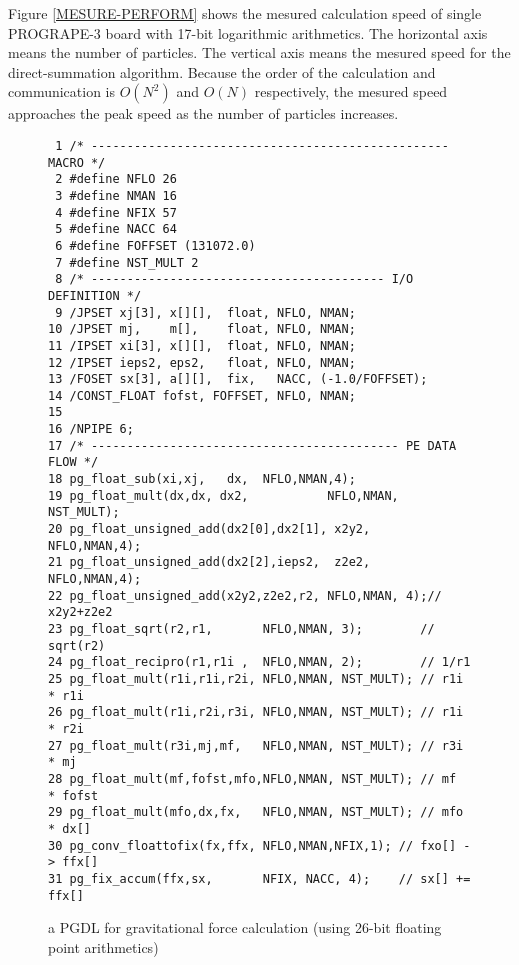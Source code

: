 \documentclass[times, 10pt,twocolumn]{article}
\begin{document}
Figure \ref{MESURE-PERFORM} shows the mesured calculation speed of
single PROGRAPE-3 board with 17-bit logarithmic arithmetics.  The
horizontal axis means the number of particles.  The vertical axis
means the mesured speed for the direct-summation algorithm.  Because
the order of the calculation and communication is $O(N^2)$ and $O(N)$
respectively, the mesured speed approaches the peak speed as the
number of particles increases.

\begin{figure}
\scriptsize
{\tiny
\begin{verbatim}
 1 /* -------------------------------------------------- MACRO */
 2 #define NFLO 26
 3 #define NMAN 16
 4 #define NFIX 57
 5 #define NACC 64
 6 #define FOFFSET (131072.0)
 7 #define NST_MULT 2
 8 /* ----------------------------------------- I/O DEFINITION */
 9 /JPSET xj[3], x[][],  float, NFLO, NMAN;
10 /JPSET mj,    m[],    float, NFLO, NMAN;
11 /IPSET xi[3], x[][],  float, NFLO, NMAN;
12 /IPSET ieps2, eps2,   float, NFLO, NMAN;
13 /FOSET sx[3], a[][],  fix,   NACC, (-1.0/FOFFSET);
14 /CONST_FLOAT fofst, FOFFSET, NFLO, NMAN;
15
16 /NPIPE 6;
17 /* ------------------------------------------- PE DATA FLOW */
18 pg_float_sub(xi,xj,   dx,  NFLO,NMAN,4);
19 pg_float_mult(dx,dx, dx2,           NFLO,NMAN, NST_MULT);
20 pg_float_unsigned_add(dx2[0],dx2[1], x2y2,  NFLO,NMAN,4);
21 pg_float_unsigned_add(dx2[2],ieps2,  z2e2,  NFLO,NMAN,4);
22 pg_float_unsigned_add(x2y2,z2e2,r2, NFLO,NMAN, 4);// x2y2+z2e2
23 pg_float_sqrt(r2,r1,       NFLO,NMAN, 3);        // sqrt(r2)
24 pg_float_recipro(r1,r1i ,  NFLO,NMAN, 2);        // 1/r1
25 pg_float_mult(r1i,r1i,r2i, NFLO,NMAN, NST_MULT); // r1i * r1i
26 pg_float_mult(r1i,r2i,r3i, NFLO,NMAN, NST_MULT); // r1i * r2i
27 pg_float_mult(r3i,mj,mf,   NFLO,NMAN, NST_MULT); // r3i * mj
28 pg_float_mult(mf,fofst,mfo,NFLO,NMAN, NST_MULT); // mf  * fofst
29 pg_float_mult(mfo,dx,fx,   NFLO,NMAN, NST_MULT); // mfo * dx[]
30 pg_conv_floattofix(fx,ffx, NFLO,NMAN,NFIX,1); // fxo[] -> ffx[]
31 pg_fix_accum(ffx,sx,       NFIX, NACC, 4);    // sx[] += ffx[]
\end{verbatim}
}
\caption{a PGDL for gravitational force calculation (using 26-bit floating point arithmetics)}
\label{figgravfloat_pgdl}
\end{figure}
\end{document}
